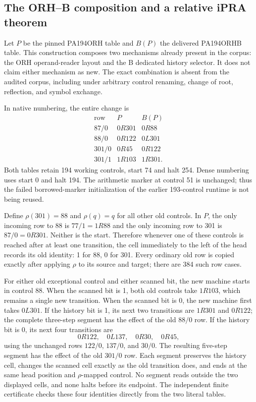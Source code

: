 \subsection{The ORH--B composition and a relative iPRA theorem}
Let $P$ be the pinned PA194ORH table and $B(P)$ the delivered
PA194ORHB table.  This construction composes two mechanisms already
present in the corpus: the ORH operand-reader layout and the B dedicated
history selector.  It does not claim either mechanism as new.  The exact
combination is absent from the audited corpus, including under arbitrary
control renaming, change of root, reflection, and symbol exchange.

In native numbering, the entire change is
\[
\begin{array}{c|cc}
\text{row}&P&B(P)\\\hline
87/0&0R301&0R88\\
88/0&0R122&0L301\\
301/0&0R45&0R122\\
301/1&1R103&1R301.
\end{array}
\]
Both tables retain 194 working controls, start 74 and halt 254.
Dense numbering uses start 0 and halt 194.  The arithmetic marker at
control 51 is unchanged; thus the failed borrowed-marker initialization
of the earlier 193-control runtime is not being reused.

Define $\rho(301)=88$ and $\rho(q)=q$ for all other old controls.
In $P$, the only incoming row to 88 is $77/1=1R88$ and the only incoming
row to 301 is $87/0=0R301$.  Neither is the start.  Therefore whenever
one of these controls is reached after at least one transition, the cell
immediately to the left of the head records its old identity: 1 for 88,
0 for 301.  Every ordinary old row is copied exactly after applying
$\rho$ to its source and target; there are 384 such row cases.

For either old exceptional control and either scanned bit, the new
machine starts in control 88.  When the scanned bit is 1, both old
controls take $1R103$, which remains a single new transition.  When the
scanned bit is 0, the new machine first takes $0L301$.  If the history
bit is 1, its next two transitions are $1R301$ and $0R122$; the complete
three-step segment has the effect of the old $88/0$ row.  If the history
bit is 0, its next four transitions are
\[
0R122,\quad 0L137,\quad 0R30,\quad 0R45,
\]
using the unchanged rows $122/0$, $137/0$, and $30/0$.
The resulting five-step segment has the effect of the old $301/0$ row.
Each segment preserves the history cell, changes the scanned cell exactly
as the old transition does, and ends at the same head position and
$\rho$-mapped control.  No segment reads outside the two displayed cells,
and none halts before its endpoint.  The independent finite certificate
checks these four identities directly from the two literal tables.

